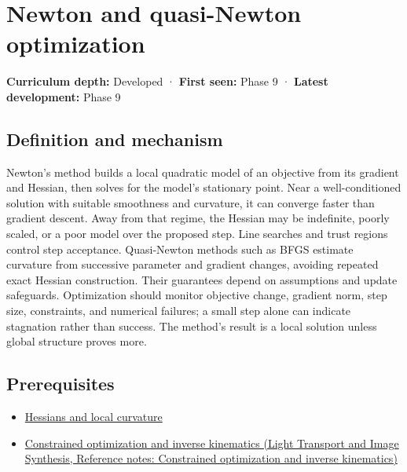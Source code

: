 \hypertarget{appendix-54c8f5828387}{}\label{referencestart:appendix-54c8f5828387}
\section{Newton and quasi-Newton optimization}\label{appendix-54c8f5828387-newton-and-quasi-newton-optimization}

\hypertarget{appendix-54c8f5828387-newton-and-quasi-newton-optimization}{}

\textbf{Curriculum depth:} Developed · \textbf{First seen:} Phase 9 · \textbf{Latest development:} Phase 9

\begin{allmightroledefinition}

\subsection{Definition and mechanism}\label{appendix-54c8f5828387-definition-and-mechanism}

\hypertarget{appendix-54c8f5828387-definition-and-mechanism}{}

Newton's method builds a local quadratic model of an objective from its gradient and Hessian, then solves for the model's stationary point. Near a well-conditioned solution with suitable smoothness and curvature, it can converge faster than gradient descent. Away from that regime, the Hessian may be indefinite, poorly scaled, or a poor model over the proposed step. Line searches and trust regions control step acceptance. Quasi-Newton methods such as BFGS estimate curvature from successive parameter and gradient changes, avoiding repeated exact Hessian construction. Their guarantees depend on assumptions and update safeguards. Optimization should monitor objective change, gradient norm, step size, constraints, and numerical failures; a small step alone can indicate stagnation rather than success. The method's result is a local solution unless global structure proves more.

\end{allmightroledefinition}

\subsection{Prerequisites}\label{appendix-54c8f5828387-prerequisites}

\hypertarget{appendix-54c8f5828387-prerequisites}{}

\begin{itemize}
\tightlist
\item
  \hyperref[appendix-6ac071f8b50c]{Hessians and local curvature}
\item
  \href{../04-Light-Transport-and-Image-Synthesis/main.pdf\#nameddest=appendix-29f4bea4c2bb}{Constrained optimization and inverse kinematics (Light Transport and Image Synthesis, Reference notes: Constrained optimization and inverse kinematics)}
\end{itemize}

